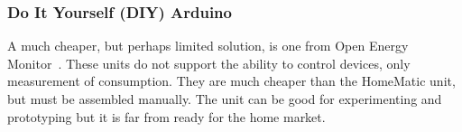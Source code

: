 \subsubsection{Do It Yourself (DIY) Arduino}
A much cheaper, but perhaps limited solution, is one from Open Energy Monitor~\cite{oemmodule}. These units do not support the ability to control devices, only measurement of consumption. They are much cheaper than the HomeMatic unit, but must be assembled manually. The unit can be good for experimenting and prototyping but it is far from ready for the home market.


